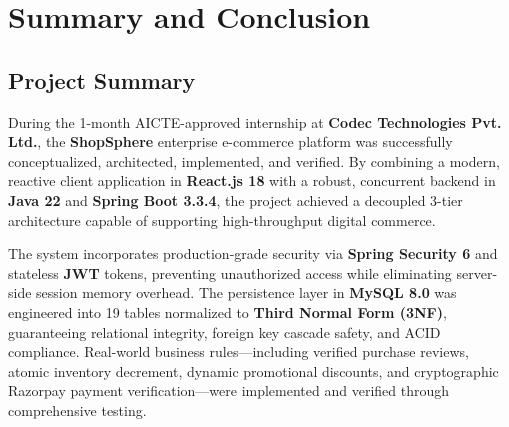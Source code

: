 \chapter{Summary and Conclusion}
\label{ch:conclusion}

\section{Project Summary}
During the 1-month AICTE-approved internship at \textbf{Codec Technologies Pvt. Ltd.}, the \textbf{ShopSphere} enterprise e-commerce platform was successfully conceptualized, architected, implemented, and verified. By combining a modern, reactive client application in \textbf{React.js 18} with a robust, concurrent backend in \textbf{Java 22} and \textbf{Spring Boot 3.3.4}, the project achieved a decoupled 3-tier architecture capable of supporting high-throughput digital commerce.

The system incorporates production-grade security via \textbf{Spring Security 6} and stateless \textbf{JWT} tokens, preventing unauthorized access while eliminating server-side session memory overhead. The persistence layer in \textbf{MySQL 8.0} was engineered into 19 tables normalized to \textbf{Third Normal Form (3NF)}, guaranteeing relational integrity, foreign key cascade safety, and ACID compliance. Real-world business rules—including verified purchase reviews, atomic inventory decrement, dynamic promotional discounts, and cryptographic Razorpay payment verification—were implemented and verified through comprehensive testing.

